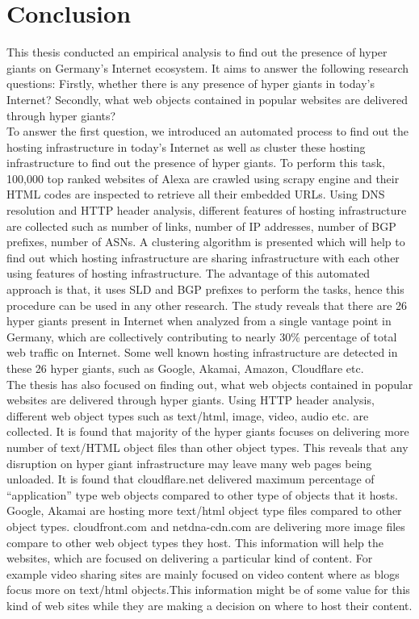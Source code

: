 \section{Conclusion\label{cha:chapter7}}
\noindent This thesis conducted an empirical analysis to find out the presence of hyper giants on Germany's Internet ecosystem. It aims to answer the following research questions: Firstly, whether there is any presence of hyper giants in today's Internet? Secondly, what web objects contained in popular websites are delivered through hyper giants? \\

\noindent To answer the first question, we introduced an automated process to find out the hosting infrastructure in today's Internet as well as cluster these hosting infrastructure to find out the presence of hyper giants. To perform this task, 100,000 top ranked websites of Alexa are crawled using scrapy engine and their HTML codes are inspected to retrieve all their embedded URLs. Using DNS resolution and HTTP header analysis, different features of hosting infrastructure are collected such as number of links, number of IP addresses, number of BGP prefixes, number of ASNs. A clustering algorithm is presented which will help to find out which hosting infrastructure are sharing infrastructure with each other using features of hosting infrastructure. The advantage of this automated approach is that, it uses SLD and BGP prefixes to perform the tasks, hence this procedure can be used in any other research. The study reveals that there are 26 hyper giants present in Internet when analyzed from a single vantage point in Germany, which are collectively contributing to nearly 30\% percentage of total web traffic on Internet. Some well known hosting infrastructure are detected in these 26 hyper giants, such as Google, Akamai, Amazon, Cloudflare etc.\\

\noindent The thesis has also focused on finding out, what web objects contained in popular websites are delivered through hyper giants. Using HTTP header analysis, different web object types such as text/html, image, video, audio etc. are collected. It is found that majority of the hyper giants focuses on delivering more number of text/HTML object files than other object types. This reveals that any disruption on hyper giant infrastructure may leave many web pages being unloaded. It is found that cloudflare.net delivered maximum percentage of \enquote{application} type web objects compared to other type of objects that it hosts. Google, Akamai are hosting more text/html object type files compared to other object types. cloudfront.com and netdna-cdn.com are delivering more image files compare to other web object types they host. This information will help the websites, which are focused on delivering a particular kind of content. For example video sharing sites are mainly focused on video content where as blogs focus more on text/html objects.This information might be of some value for this kind of web sites while they are making a decision on where to host their content. \\

